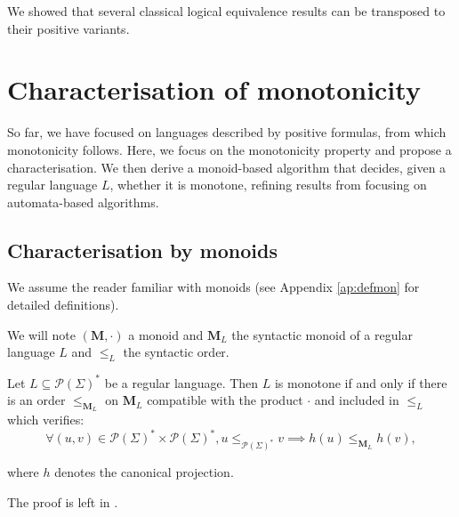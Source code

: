\documentclass[a4paper,UKenglish,cleveref, autoref, thm-restate]{lipics-v2021}
\renewcommand{\alph}{\part(\Sigma)}
\renewcommand{\part}{\mathcal{P}}
\newcommand{\M}{\mathbf{M}}
\newcommand{\leqml}{\leq_{\mathbf{M}_L}}
\newcommand{\leqa}{\leq_{\alph^*}}
\begin{document}
We showed that several classical logical equivalence results can be transposed to their positive variants.















\section{Characterisation of monotonicity} \label{sec:monoids}



So far, we have focused on languages described by positive formulas, from which monotonicity follows. Here, we focus on the monotonicity property and propose a characterisation. We then derive a monoid-based algorithm that decides, given a regular language $L$, whether it is monotone, refining results from \cite{PFO} focusing on automata-based algorithms.


\subsection{Characterisation by monoids} \label{sec:charac}


We assume the reader familiar with monoids (see Appendix \ref{ap:defmon} for detailed definitions).

We will note $(\M,\cdot)$ a monoid and $\M_L$ the syntactic monoid of a regular language $L$ and $\leq_L$ the syntactic order.












\begin{lemma}\label{ordrmono}
    Let $L\subseteq \alph^*$ be a regular language. Then $L$ is monotone if and only if there is an order $\leqml$ on $\M_L$ compatible with the product $\cdot$ and included in $\leq_L$ which verifies:
    $$
    \forall (u,v) \in \alph^* \times \alph^*, u \leqa v \implies h(u) \leqml h(v),
    $$

    where $h$ denotes the canonical projection.

\end{lemma}



The proof is left in .
\end{document}
